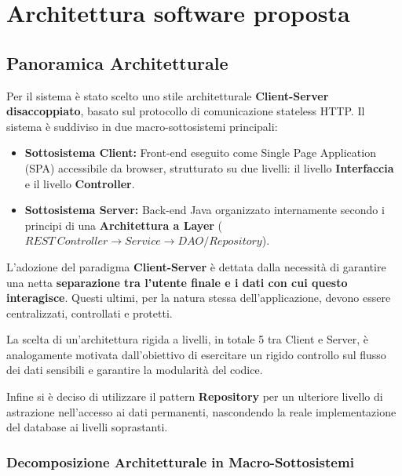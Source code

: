 \section{Architettura software proposta}

\subsection{Panoramica Architetturale}

Per il sistema è stato scelto uno stile architetturale \textbf{Client-Server disaccoppiato}, basato sul protocollo di comunicazione stateless HTTP. Il sistema è suddiviso in due macro-sottosistemi principali:
\begin{itemize}
    \item \textbf{Sottosistema Client:} Front-end eseguito come Single Page Application (SPA) accessibile da browser, strutturato su due livelli: il livello \textbf{Interfaccia} e il livello \textbf{Controller}.
    \item \textbf{Sottosistema Server:} Back-end Java organizzato internamente secondo i principi di una \textbf{Architettura a Layer} ($REST\ Controller \rightarrow Service \rightarrow DAO/Repository$).
\end{itemize}

L'adozione del paradigma \textbf{Client-Server} è dettata dalla necessità di garantire una netta \textbf{separazione tra l'utente finale e i dati con cui questo interagisce}. Questi ultimi, per la natura stessa dell'applicazione, devono essere centralizzati, controllati e protetti.

La scelta di un'architettura rigida a livelli, in totale 5 tra Client e Server, è analogamente motivata dall'obiettivo di esercitare un rigido controllo sul flusso dei dati sensibili e garantire la modularità del codice.

Infine si è deciso di utilizzare il pattern \textbf{Repository} per un ulteriore livello di astrazione nell'accesso ai dati permanenti, nascondendo la reale implementazione del database ai livelli soprastanti.

\subsubsection{Decomposizione Architetturale in Macro-Sottosistemi}

